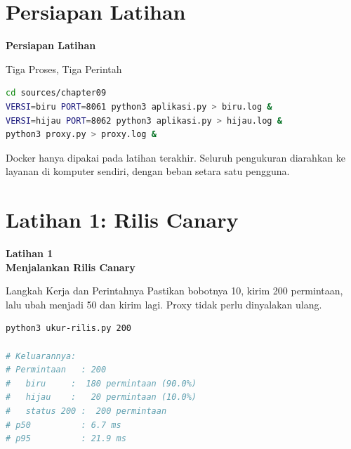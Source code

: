 \documentclass[aspectratio=169, table, 12pt]{beamer}
\begin{document}
\section{Persiapan Latihan}

\begin{frame}{\hfill}
  \centering
  \Huge{\textbf{Persiapan Latihan}}
\end{frame}

\begin{frame}[fragile]{{\Large Tiga Proses, Tiga Perintah}}
  \vspace{2pt}
\begin{lstlisting}[language=bash]
cd sources/chapter09
VERSI=biru PORT=8061 python3 aplikasi.py > biru.log &
VERSI=hijau PORT=8062 python3 aplikasi.py > hijau.log &
python3 proxy.py > proxy.log &
\end{lstlisting}
  \vspace{4pt}
  {\small Docker hanya dipakai pada latihan terakhir. Seluruh pengukuran
  diarahkan ke layanan di komputer sendiri, dengan beban setara satu
  pengguna.}
\end{frame}

\section{Latihan 1: Rilis Canary}

\begin{frame}{\hfill}
  \centering
  \Huge{\textbf{Latihan 1\\Menjalankan Rilis Canary}}
\end{frame}

\begin{frame}[fragile]{{\Large Langkah Kerja dan Perintahnya}}
  \vspace{2pt}
  {\footnotesize Pastikan bobotnya 10, kirim 200 permintaan, lalu ubah
  menjadi 50 dan kirim lagi. Proxy tidak perlu dinyalakan ulang.}
  \vspace{2pt}
\begin{lstlisting}[language=bash]
python3 ukur-rilis.py 200

# Keluarannya:
# Permintaan   : 200
#   biru     :  180 permintaan (90.0%)
#   hijau    :   20 permintaan (10.0%)
#   status 200 :  200 permintaan
# p50          : 6.7 ms
# p95          : 21.9 ms
\end{lstlisting}
\end{frame}
\end{document}

